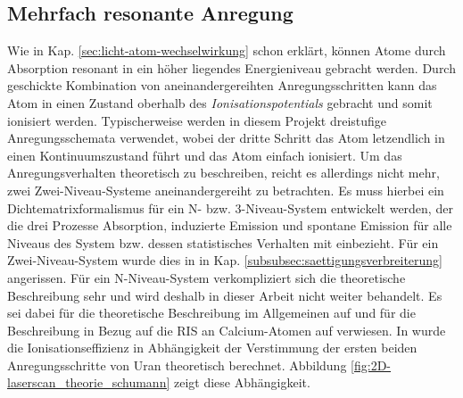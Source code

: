 \subsection{Mehrfach
resonante Anregung}\label{subsec:mehrfach_resonante_anregung}
Wie in Kap. \ref{sec:licht-atom-wechselwirkung} schon erklärt, können Atome
durch Absorption resonant in ein höher liegendes Energieniveau gebracht werden.
Durch geschickte Kombination von aneinandergereihten Anregungsschritten kann
das Atom in einen Zustand oberhalb des \textit{Ionisationspotentials} gebracht
und somit ionisiert werden. Typischerweise werden in diesem Projekt dreistufige
Anregungsschemata verwendet, wobei der dritte Schritt das Atom letzendlich in
einen Kontinuumszustand führt und das Atom einfach ionisiert. Um das
Anregungsverhalten theoretisch zu beschreiben, reicht es allerdings nicht mehr,
zwei Zwei-Niveau-Systeme aneinandergereiht zu betrachten. Es muss hierbei ein
Dichtematrixformalismus für ein N- bzw. 3-Niveau-System entwickelt werden, der
die drei Prozesse Absorption, induzierte Emission und spontane Emission für alle
Niveaus des System bzw. dessen statistisches Verhalten mit einbezieht. Für ein
Zwei-Niveau-System wurde dies in in Kap. 
\ref{subsubsec:saettigungsverbreiterung} angerissen. Für ein N-Niveau-System
verkompliziert sich die theoretische Beschreibung sehr und wird deshalb in
dieser Arbeit nicht weiter behandelt. Es sei dabei für die theoretische
Beschreibung im Allgemeinen auf \cite{blum:density_matrix_theory} und für die
Beschreibung in Bezug auf die RIS an Calcium-Atomen auf
\cite{noertershaeuser:1999:dissertation} verwiesen. In
\cite{schumann:2005:dissertation} wurde die Ionisationseffizienz in Abhängigkeit
der Verstimmung der ersten beiden Anregungsschritte von Uran theoretisch
berechnet. Abbildung \ref{fig:2D-laserscan_theorie_schumann} zeigt diese
Abhängigkeit.

